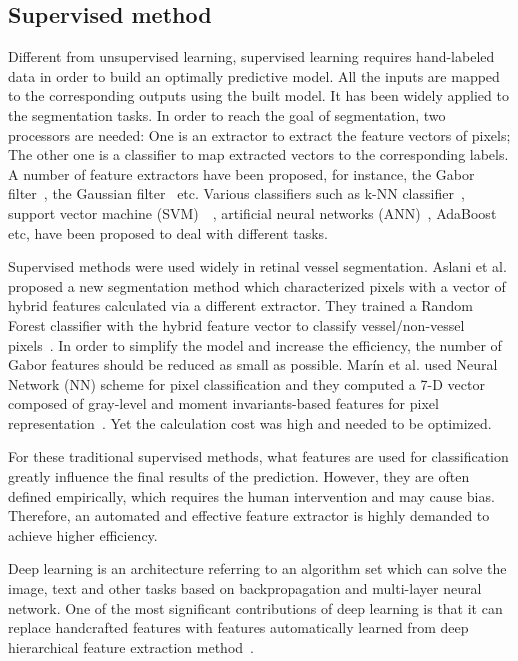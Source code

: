 \documentclass[journal]{IEEEtran}
\begin{document}
\subsection{Supervised method}
Different from unsupervised learning, supervised learning requires hand-labeled data in order to build an optimally predictive model. All the inputs are mapped to the corresponding outputs using the built model. It has been widely applied to the segmentation tasks. In order to reach the goal of segmentation, two processors are needed: One is an extractor to extract the feature vectors of pixels; The other one is a classifier to map extracted vectors to the corresponding labels. A number of feature extractors have been proposed, for instance, the Gabor filter~\cite{hamamoto_gabor_1998}, the Gaussian filter~\cite{nguyen_application_2011} etc. Various classifiers such as k-NN classifier~\cite{staal_ridge-based_2004}, support vector machine (SVM)~\cite{ricci_retinal_2007}~\cite{you_segmentation_2011}, artificial neural networks (ANN)~\cite{sinthanayothin_automated_1999}, AdaBoost~\cite{li_adaboost_2008} etc, have been proposed to deal with different tasks.

Supervised methods were used widely in retinal vessel segmentation. Aslani et al. proposed a new segmentation method which characterized pixels with a vector of hybrid features calculated via a different extractor. They trained a Random Forest classifier with the hybrid feature vector to classify vessel/non-vessel pixels~\cite{aslani_new_2016}. In order to simplify the model and increase the efficiency, the number of Gabor features should be reduced as small as possible. Marín et al. used Neural Network (NN) scheme for pixel classification and they computed a 7-D vector composed of gray-level and moment invariants-based features for pixel representation~\cite{marin_new_2011}. Yet the calculation cost was high and needed to be optimized.

For these traditional supervised methods, what features are used for classification greatly influence the final results of the prediction. However, they are often defined empirically, which requires the human intervention and may cause bias. Therefore, an automated and effective feature extractor is highly demanded to achieve higher efficiency.

Deep learning is an architecture referring to an algorithm set which can solve the image, text and other tasks based on backpropagation and multi-layer neural network. One of the most significant contributions of deep learning is that it can replace handcrafted features with features automatically learned from deep hierarchical feature extraction method~\cite{song_hierarchical_2013}.
\end{document}
